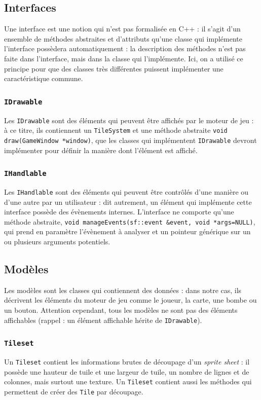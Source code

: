 \documentclass[a4paper,10pt]{report}
\begin{document}
\subsection{Interfaces}
Une interface est une notion qui n'est pas formalisée en C++ : il s'agit d'un ensemble de méthodes abstraites et d'attributs qu'une classe qui implémente l'interface possèdera automatiquement : la description des méthodes n'est pas faite dans l'interface, mais dans la classe qui l'implémente. Ici, on a utilisé ce principe pour que des classes très différentes puissent implémenter une caractéristique commune.
\subsubsection{\texttt{IDrawable}}

Les \texttt{IDrawable} sont des éléments qui peuvent être affichés par le moteur de jeu : à ce titre, ils contiennent un \texttt{TileSystem} et une méthode abstraite \texttt{void draw(GameWindow *window)}, que les classes qui implémentent \texttt{IDrawable} devront implémenter pour définir la manière dont l'élément est affiché.
\subsubsection{\texttt{IHandlable}}

Les \texttt{IHandlable} sont des éléments qui peuvent être contrôlés d'une manière ou d'une autre par un utilisateur : dit autrement, un élément qui implémente cette interface possède des évènements internes. L'interface ne comporte qu'une méthode abstraite, \texttt{void manageEvents(sf::event \&event, void *args=NULL)}, qui prend en paramètre l'évènement à analyser et un pointeur générique sur un ou plusieurs arguments potentiels.
\subsection{Modèles}
Les modèles sont les classes qui contiennent des données : dans notre cas, ils décrivent les éléments du moteur de jeu comme le joueur, la carte, une bombe ou un bouton. Attention cependant, tous les modèles ne sont pas des éléments affichables (rappel : un élément affichable hérite de \texttt{IDrawable}).
\subsubsection{\texttt{Tileset}}

Un \texttt{Tileset} contient les informations brutes de découpage d'un \textit{sprite sheet} : il possède une hauteur de tuile et une largeur de tuile, un nombre de lignes et de colonnes, mais surtout une texture. Un \texttt{Tileset} contient aussi les méthodes qui permettent de créer des \texttt{Tile} par découpage.
\end{document}
